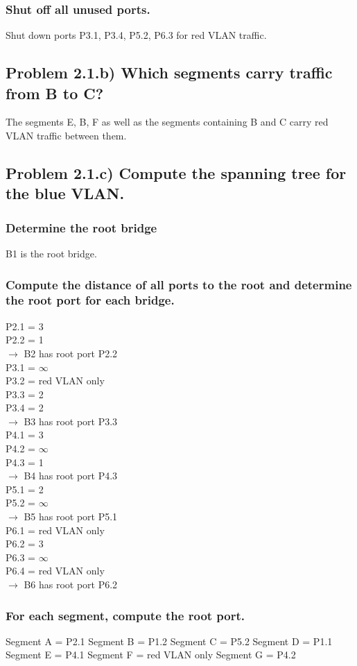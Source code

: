 \documentclass[a4paper,10pt]{article}
\begin{document}
\subsubsection{Shut off all unused ports. }
Shut down ports P3.1, P3.4, P5.2, P6.3 for red VLAN traffic.
\subsection{Problem 2.1.b) Which segments carry traffic from B to C?}
The segments E, B, F as well as the segments containing B and C carry red VLAN traffic between them.

\subsection{Problem 2.1.c) Compute the spanning tree for the blue VLAN.}
\subsubsection{Determine the root bridge}
B1 is the root bridge.
\subsubsection{Compute the distance of all ports to the root and determine the root port for each bridge. }
P2.1 = 3\\
P2.2 = 1\\
$\rightarrow$ B2 has root port P2.2\\
P3.1 = $\infty$\\
P3.2 = red VLAN only\\
P3.3 = 2\\
P3.4 = 2\\
$\rightarrow$ B3 has root port P3.3\\
P4.1 = 3\\
P4.2 = $\infty$\\
P4.3 = 1\\
$\rightarrow$ B4 has root port P4.3\\
P5.1 = 2\\
P5.2 = $\infty$\\
$\rightarrow$ B5 has root port P5.1\\
P6.1 = red VLAN only\\
P6.2 = 3\\
P6.3 = $\infty$\\
P6.4 = red VLAN only\\
$\rightarrow$ B6 has root port P6.2
\subsubsection{For each segment, compute the root port. }
Segment A = P2.1
Segment B = P1.2
Segment C = P5.2
Segment D = P1.1
Segment E = P4.1
Segment F = red VLAN only
Segment G = P4.2
\end{document}
